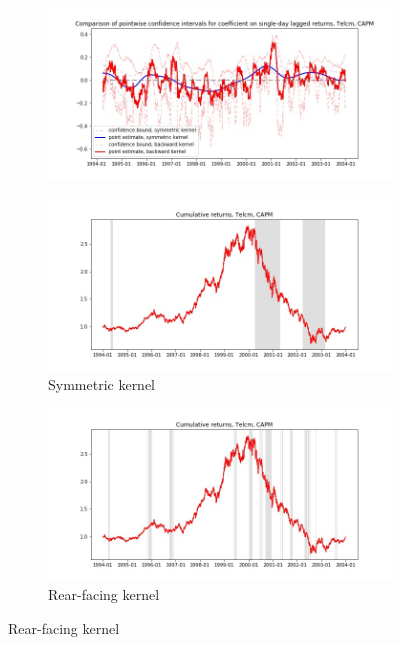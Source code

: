 \documentclass{article}
\begin{document}
\newpage

\begin{figure}

\centering

  \begin{subfigure}[b]{\textwidth}
    \includegraphics[width=\textwidth]{Telcm/pointwiseCIs_layered_CAPM.jpg}
    \label{fig:1}
  \end{subfigure}
  \begin{subfigure}[b]{0.45\textwidth}
    \includegraphics[width=\textwidth]{Telcm/full_cumrets_ofint_CAPM.jpg}
    \caption*{Symmetric kernel}
    \label{fig:2}
  \end{subfigure}
   \begin{subfigure}[b]{0.45\textwidth}
    \includegraphics[width=\textwidth]{Telcm/bwunif_full_cumrets_ofint_CAPM.jpg}
    \caption*{Rear-facing kernel}
    \label{fig:2}
  \end{subfigure}
  
\end{figure}
\end{document}
